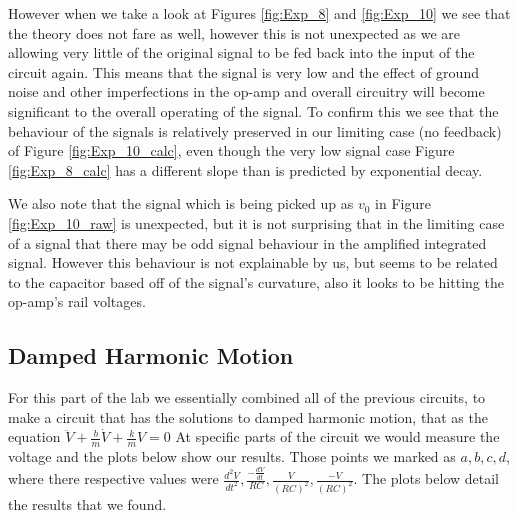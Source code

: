 However when we take a look at Figures \ref{fig:Exp_8} and \ref{fig:Exp_10} we see that the theory does not fare as well, however this is not unexpected as we are allowing very little of the original signal to be fed back into the input of the circuit again. This means that the signal is very low and the effect of ground noise and other imperfections in the op-amp and overall circuitry will become significant to the overall operating of the signal. To confirm this we see that the behaviour of the signals is relatively preserved in our limiting case (no feedback) of Figure \ref{fig:Exp_10_calc}, even though the very low signal case Figure \ref{fig:Exp_8_calc} has a different slope than is predicted by exponential decay.\newline

We also note that the signal which is being picked up as $v_0$ in Figure \ref{fig:Exp_10_raw} is unexpected, but it is not surprising that in the limiting case of a signal that there may be odd signal behaviour in the amplified integrated signal. However this behaviour is not explainable by us, but seems to be related to the capacitor based off of the signal's curvature, also it looks to be hitting the op-amp's rail voltages.

\clearpage
\subsection{Damped Harmonic Motion} \label{sec:DHO}

For this part of the lab we essentially combined all of the previous circuits, to make a circuit that has the solutions to damped harmonic motion, that as the equation $\ddot{V} + \frac{b}{m}\dot{V}+\frac{k}{m}V = 0$ At specific parts of the circuit we would measure the voltage and the plots below show our results. Those points we marked as $a,b,c,d$, where there
respective values were $\frac{d^2V}{dt^2}, \frac{-\frac{dV}{dt}}{RC}, \frac{V}{(RC)^2}, \frac{-V}{(RC)^2}$. The plots below detail the results that we found.

